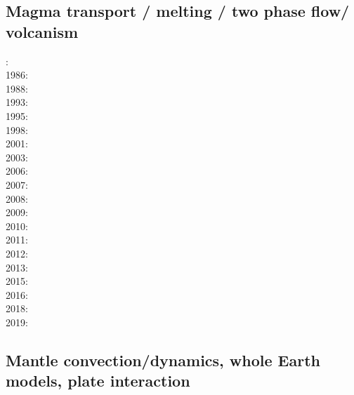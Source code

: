 \subsection*{Magma transport / melting / two phase flow/ volcanism}

: \cite{scst84}\cite{mcke84}\\
1986: \cite{scst86}\\
1988: \cite{scot88}\\
1993: \cite{spie93}\\
1995: \cite{bisc95}\\
1998: \cite{rabg98}\\
2001: \cite{bers01}\\
2003: \cite{beri03}\\
2006: \cite{omma06}\\
2007: \cite{srrb07}\cite{mohb07}\\
2008: \cite{hets08}\cite{hest08}\\
2009: \cite{bavi09}\\
2010: \cite{baiv10}\\
2011: \cite{baiv11}\cite{zhgy11}\cite{zhgh11}\\
2012: \cite{yatd12}\\
2013: \cite{kemk13}\cite{mofm13}\\
2015: \cite{tukb15}\\
2016: \cite{keka16}\\
2018: \cite{lorg18}\\
2019: \cite{dagg19}


\subsection*{Mantle convection/dynamics, whole Earth models, plate interaction}

